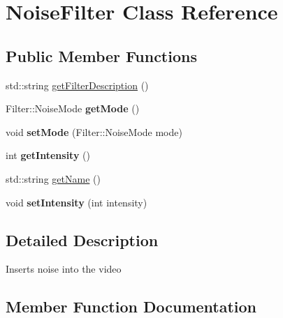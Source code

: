 \hypertarget{classFilter_1_1NoiseFilter}{}\section{Noise\+Filter Class Reference}
\label{classFilter_1_1NoiseFilter}
\subsection*{Public Member Functions}
\begin{DoxyCompactItemize}
\item 
std\+::string \hyperlink{classFilter_1_1NoiseFilter_a2b3f7d8fcd3d774b4a2fde5914a9729f}{get\+Filter\+Description} ()
\item 
\hypertarget{classFilter_1_1NoiseFilter_a02b33228be4a42ee83f966d352a8bde8}{}Filter\+::\+Noise\+Mode {\bfseries get\+Mode} ()\label{classFilter_1_1NoiseFilter_a02b33228be4a42ee83f966d352a8bde8}

\item 
\hypertarget{classFilter_1_1NoiseFilter_a21a8227b5282965f7964993edbc0f929}{}void {\bfseries set\+Mode} (Filter\+::\+Noise\+Mode mode)\label{classFilter_1_1NoiseFilter_a21a8227b5282965f7964993edbc0f929}

\item 
\hypertarget{classFilter_1_1NoiseFilter_a708995fb1b6acb31ee0dfb0f4881e5b5}{}int {\bfseries get\+Intensity} ()\label{classFilter_1_1NoiseFilter_a708995fb1b6acb31ee0dfb0f4881e5b5}

\item 
std\+::string \hyperlink{classFilter_1_1NoiseFilter_ac0fc966d4386ddb71d99361e3fccb311}{get\+Name} ()
\item 
\hypertarget{classFilter_1_1NoiseFilter_ac8255ffbc46bb61acaa8fd23d0d260eb}{}void {\bfseries set\+Intensity} (int intensity)\label{classFilter_1_1NoiseFilter_ac8255ffbc46bb61acaa8fd23d0d260eb}

\end{DoxyCompactItemize}


\subsection{Detailed Description}
Inserts noise into the video 

\subsection{Member Function Documentation}
\hypertarget{classFilter_1_1NoiseFilter_a2b3f7d8fcd3d774b4a2fde5914a9729f}{}
